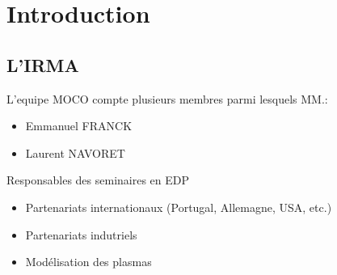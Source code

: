 \documentclass[xcolor=dvipsnames]{beamer} %
\begin{document}
\begin{frame}
\maketitle
\end{frame}
\endgroup



\section{Introduction}    %

\subsection{L'IRMA}
	
\begin{frame}
	L'equipe MOCO compte plusieurs membres parmi lesquels MM.: %
	\begin{itemize}
		\item Emmanuel FRANCK %
		\item Laurent NAVORET %
  \end{itemize}
  Responsables des seminaires en EDP

  \pause
	\begin{itemize}
		\item Partenariats internationaux (Portugal, Allemagne, USA, etc.)  %
		\item Partenariats indutriels  %
		\item Modélisation des plasmas  %
  \end{itemize}

\end{frame}
\end{document}
